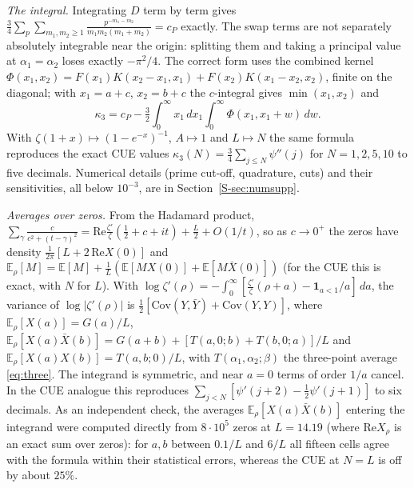 \documentclass[12pt]{amsart}
\theoremstyle{remark}
\newcommand{\E}{\mathbb{E}}
\newcommand{\1}{\mathbf{1}}
\begin{document}
\emph{The integral.} Integrating $D$ term by term gives
$\frac34\sum_p\sum_{m_1,m_2\ge1}\frac{p^{-m_1-m_2}}{m_1m_2(m_1+m_2)}=c_P$
exactly. The swap terms are not separately absolutely integrable near the
origin: splitting them and taking a principal value at $\alpha_1=\alpha_2$
loses exactly $-\pi^2/4$. The correct form uses the combined kernel
$\Phi(x_1,x_2)=F(x_1)K(x_2-x_1,x_1)+F(x_2)K(x_1-x_2,x_2)$, finite on the
diagonal; with $x_1=a+c$, $x_2=b+c$ the $c$-integral gives
$\min(x_1,x_2)$ and
\[
\kappa_3=c_P-\tfrac32\int_0^\infty x_1\,dx_1\int_0^\infty
\Phi(x_1,x_1+w)\,dw.
\]
With $\zeta(1+x)\mapsto(1-e^{-x})^{-1}$, $A\mapsto1$ and $L\mapsto N$
the same formula reproduces the exact CUE values
$\kappa_3(N)=\frac34\sum_{j\le N}\psi''(j)$ for $N=1,2,5,10$ to five
decimals. Numerical details (prime cut-off, quadrature, cuts) and their
sensitivities, all below $10^{-3}$, are in Section~\ref{S-sec:numsupp}.

\emph{Averages over zeros.} From the Hadamard product,
$\sum_\gamma\frac{c}{c^2+(t-\gamma)^2}=\mathrm{Re}\frac{\zeta'}\zeta(\frac12+c+it)
+\frac L2+O(1/t)$, so as $c\to0^+$ the zeros have density
$\frac1{2\pi}[L+2\,\mathrm{Re}X(0)]$ and
$\E_\rho[M]=\E[M]+\frac1L(\E[MX(0)]+\E[M\bar X(0)])$ (for the CUE this is
exact, with $N$ for $L$). With
$\log\zeta'(\rho)=-\int_0^\infty[\frac{\zeta'}\zeta(\rho+a)-\1_{a<1}/a]\,da$,
the variance of $\log|\zeta'(\rho)|$ is
$\frac12[\mathrm{Cov}(Y,\bar Y)+\mathrm{Cov}(Y,Y)]$, where
$\E_\rho[X(a)]=G(a)/L$,
$\E_\rho[X(a)\bar X(b)]=G(a+b)+[T(a,0;b)+T(b,0;a)]/L$ and
$\E_\rho[X(a)X(b)]=T(a,b;0)/L$, with $T(\alpha_1,\alpha_2;\beta)$ the
three-point average \eqref{eq:three}. The integrand is symmetric, and near
$a=0$ terms of order $1/a$ cancel. In the CUE analogue this reproduces
$\sum_{j<N}[\psi'(j+2)-\frac12\psi'(j+1)]$ to six decimals. As an
independent check, the averages $\E_\rho[X(a)\bar X(b)]$ entering the
integrand were computed directly from $8\cdot10^5$ zeros at $L=14.19$ (where
$\mathrm{Re}X_\rho$ is an exact sum over zeros): for $a,b$ between $0.1/L$
and $6/L$ all fifteen cells agree with the formula within their
statistical errors, whereas the CUE at $N=L$ is off by about $25\%$.
\end{document}

